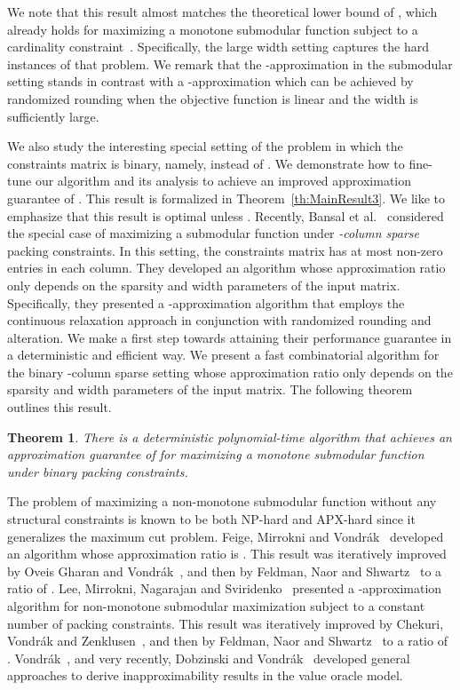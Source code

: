 \documentclass[11pt]{article}
\theoremstyle{plain}
\newtheorem{theorem}{Theorem}[section]
\theoremstyle{definition}
\begin{document}
We note that this result almost matches the theoretical lower
bound of , which already holds for maximizing a monotone
submodular function subject to a cardinality
constraint~\cite{NemhauserWF78,Feige98}. Specifically, the large
width setting captures the hard instances of that problem. We
remark that the -approximation in the submodular
setting stands in contrast with a -approximation
which can be achieved by randomized rounding when the objective
function is linear and the width is sufficiently large.

We also study the interesting special setting of the problem in
which the constraints matrix is binary, namely,  instead of . We demonstrate
how to fine-tune our algorithm and its analysis to achieve an
improved approximation guarantee of .
This result is formalized in Theorem~\ref{th:MainResult3}. We like
to emphasize that this result is optimal unless . Recently, Bansal et al.~\cite{BansalKNS10}
considered the special case of maximizing a submodular function
under \emph{-column sparse} packing constraints. In this
setting, the constraints matrix has at most  non-zero entries
in each column. They developed an algorithm whose approximation
ratio only depends on the sparsity and width parameters of the
input matrix. Specifically, they presented a -approximation algorithm that employs the continuous
relaxation approach in conjunction with randomized rounding and
alteration. We make a first step towards attaining their
performance guarantee in a deterministic and efficient way. We
present a fast combinatorial algorithm for the binary -column
sparse setting whose approximation ratio only depends on the
sparsity and width parameters of the input matrix. The following
theorem outlines this result.

\begin{theorem} \label{th:MainResult4}
There is a deterministic polynomial-time algorithm that achieves
an approximation guarantee of  for
maximizing a monotone submodular function under binary packing
constraints.
\end{theorem}


\medskip {}
The problem of maximizing a non-monotone submodular function
without any structural constraints is known to be both NP-hard and
APX-hard since it generalizes the maximum cut problem. Feige,
Mirrokni and Vondr{\'a}k~\cite{FeigeMV07} developed an algorithm
whose approximation ratio is . This result was iteratively
improved by Oveis Gharan and Vondr{\'a}k~\cite{GharanV11}, and
then by Feldman, Naor and Shwartz~\cite{FeldmanNS11b} to a ratio
of . Lee, Mirrokni, Nagarajan and Sviridenko~\cite{LeeMNS10}
presented a -approximation algorithm for
non-monotone submodular maximization subject to a constant number
of packing constraints. This result was iteratively improved by
Chekuri, Vondr{\'a}k and Zenklusen~\cite{ChekuriVZ11}, and then by
Feldman, Naor and Shwartz~\cite{FeldmanNS11a} to a ratio of
. Vondr{\'a}k~\cite{Vondrak09}, and very recently,
Dobzinski and Vondr{\'a}k~\cite{DobzinskiV12} developed general
approaches to derive inapproximability results in the value oracle
model.
\end{document}
